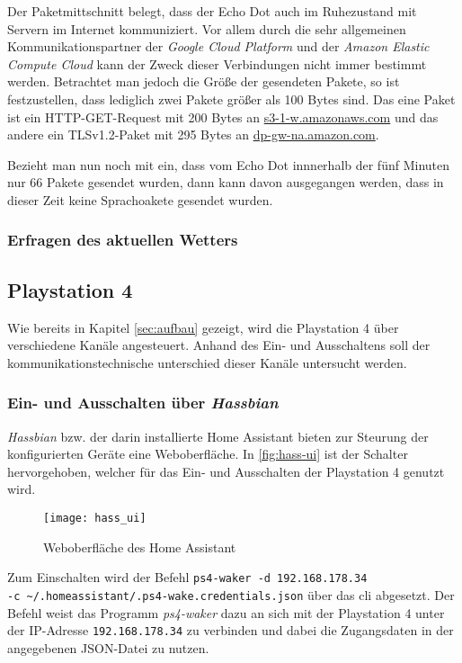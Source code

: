 Der Paketmittschnitt belegt, dass der Echo Dot auch im Ruhezustand mit Servern im Internet kommuniziert.
Vor allem durch die sehr allgemeinen Kommunikationspartner der \textit{Google Cloud Platform} und der \textit{Amazon Elastic Compute Cloud}
kann der Zweck dieser Verbindungen nicht immer bestimmt werden.
Betrachtet man jedoch die Größe der gesendeten Pakete, so ist festzustellen,
dass lediglich zwei Pakete größer als 100 Bytes sind.
Das eine Paket ist ein HTTP-GET-Request mit 200 Bytes an \url{s3-1-w.amazonaws.com} und
das andere ein TLSv1.2-Paket mit 295 Bytes an \url{dp-gw-na.amazon.com}.

Bezieht man nun noch mit ein, dass vom Echo Dot innnerhalb der fünf Minuten nur 66 Pakete gesendet wurden,
dann kann davon ausgegangen werden, dass in dieser Zeit keine Sprachoakete gesendet wurden.

\subsubsection{Erfragen des aktuellen Wetters}


\subsection{Playstation 4}
Wie bereits in Kapitel \ref{sec:aufbau} \textit{} gezeigt, wird die Playstation 4 über verschiedene Kanäle angesteuert.
Anhand des Ein- und Ausschaltens soll der kommunikationstechnische unterschied dieser Kanäle untersucht werden.

\subsubsection{Ein- und Ausschalten über \textit{Hassbian}}
\textit{Hassbian} bzw. der darin installierte Home Assistant bieten zur Steurung der konfigurierten Geräte eine Weboberfläche.
In \autoref{fig:hass-ui} ist der Schalter hervorgehoben, welcher für das Ein- und Ausschalten der Playstation 4 genutzt wird.

\begin{figure}[h!]
    \centering
    \texttt{[image: hass\_ui]}
    \caption{Weboberfläche des Home Assistant}\label{fig:hass-ui}
\end{figure}

Zum Einschalten wird der Befehl \texttt{ps4-waker -d 192.168.178.34 \\ -c \textasciitilde{}/.homeassistant/.ps4-wake.credentials.json} über das \ac{cli} abgesetzt.
Der Befehl weist das Programm \textit{ps4-waker} dazu an sich mit der Playstation 4 unter der IP-Adresse \texttt{192.168.178.34} zu verbinden und dabei die Zugangsdaten in der angegebenen JSON-Datei zu nutzen.

